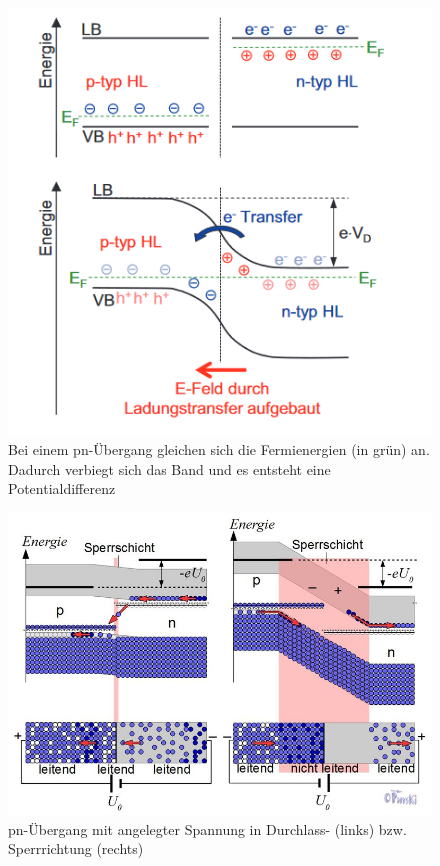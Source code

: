 \begin{figure}[h]
    \centering
    \includegraphics[scale=0.75]{Bilder/Bandverbiegung.png}
    \caption{Bei einem pn-Übergang gleichen sich die Fermienergien (in grün) an. Dadurch verbiegt sich das Band und es entsteht eine 
    Potentialdifferenz \protect \footnotemark}
\end{figure}


\begin{figure}[h]
    \centering
    \includegraphics[scale=0.5]{Bilder/DurchlassSperr.jpg}
    \caption{pn-Übergang mit angelegter Spannung in Durchlass- (links) bzw. Sperrrichtung (rechts) \protect \footnotemark}
\end{figure}

